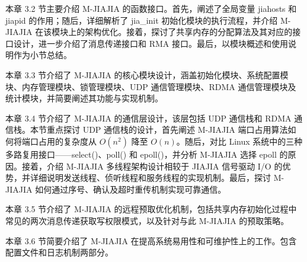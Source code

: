 {    本章 3.2 节主要介绍 M-JIAJIA 的函数接口。首先，阐述了全局变量 jiahosts 和 jiapid 的作用；随后，详细解析了 jia\_init 初始化模块的执行流程，并介绍 M-JIAJIA 在该模块上的架构优化。接着，探讨了共享内存的分配算法及其对应的接口设计，进一步介绍了消息传递接口和 RMA 接口。最后，以模块概述和使用说明作为小节总结。

    本章 3.3 节介绍了 M-JIAJIA 的核心模块设计，涵盖初始化模块、系统配置模块、内存管理模块、锁管理模块、UDP 通信管理模块、RDMA 通信管理模块及统计模块，并简要阐述其功能与实现机制。

    本章 3.4 节介绍了 M-JIAJIA 的通信层设计，该层包括 UDP 通信栈和 RDMA 通信栈。本节重点探讨 UDP 通信栈的设计，首先阐述 M-JIAJIA 端口占用算法如何将端口占用的复杂度从 $O(n^2)$ 降至 $O(n)$。随后，对比 Linux 系统中的三种多路复用接口——select()、poll() 和 epoll()，并分析 M-JIAJIA 选择 epoll 的原因。接着，介绍 M-JIAJIA 多线程架构设计相较于 JIAJIA 信号驱动 I/O 的优势，并详细说明发送线程、侦听线程和服务线程的实现机制。最后，探讨 M-JIAJIA 如何通过序号、确认及超时重传机制实现可靠通信。

    本章 3.5 节介绍了 M-JIAJIA 的远程预取优化机制，包括共享内存初始化过程中常见的两次消息传递获取写权限模式，以及针对与此 M-JIAJIA 的预取策略。

    本章 3.6 节简要介绍了 M-JIAJIA 在提高系统易用性和可维护性上的工作。包含配置文件和日志机制两部分。

}

